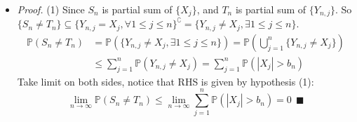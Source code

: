\documentclass[a4paper,12pt,twoside]{book}
\begin{document}
\begin{itemize}
	\item[]\textit{Proof.} (1) Since $S_n$ is partial sum of $\{X_j\}$, and $T_n$ is partial sum of $\{Y_{n,j}\}$. So $\{S_n \ne T_n\} \subseteq \{Y_{n,j}=X_j, \forall 1\leq j\leq n\}^{\complement} = \{Y_{n,j}\ne X_j, \exists 1\leq j\leq n\}$.
	\begin{equation}
		\begin{split}
			\mathbb{P}\left(S_n \ne T_n\right)&=\mathbb{P}\left(\{Y_{n,j}\ne X_j, \exists 1\leq j\leq n\}\right)= \mathbb{P}\left(\bigcup_{j=1}^n\{Y_{n,j}\ne X_j\}\right)\\
			&\leq \sum_{j=1}^n \mathbb{P}\left(Y_{n,j}\ne X_j\right)=\sum_{j=1}^n \mathbb{P}\left(|X_j|>b_n\right)
		\end{split}
	\end{equation}
	Take limit on both sides, notice that RHS is given by hypothesis (1):
	\begin{equation}
		\lim\limits_{n\rightarrow\infty}\mathbb{P}\left(S_n \ne T_n\right) \leq \lim\limits_{n\rightarrow\infty}\sum_{j=1}^n \mathbb{P}\left(|X_j|>b_n\right) = 0 ~~\blacksquare
	\end{equation}


\end{itemize}
\end{document}
